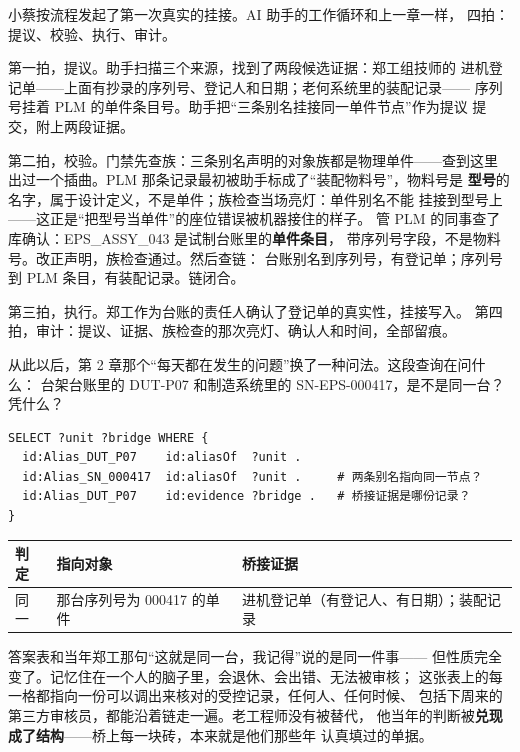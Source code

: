 小蔡按流程发起了第一次真实的挂接。AI 助手的工作循环和上一章一样，
四拍：提议、校验、执行、审计。

第一拍，提议。助手扫描三个来源，找到了两段候选证据：郑工组技师的
进机登记单——上面有抄录的序列号、登记人和日期；老何系统里的装配记录——
序列号挂着 PLM 的单件条目号。助手把“三条别名挂接同一单件节点”作为提议
提交，附上两段证据。

第二拍，校验。门禁先查族：三条别名声明的对象族都是物理单件——查到这里
出过一个插曲。PLM 那条记录最初被助手标成了“装配物料号”，物料号是
\textbf{型号}的名字，属于设计定义，不是单件；族检查当场亮灯：单件别名不能
挂接到型号上——这正是“把型号当单件”的座位错误被机器接住的样子。
管 PLM 的同事查了库确认：EPS\_ASSY\_043 是试制台账里的\textbf{单件条目}，
带序列号字段，不是物料号。改正声明，族检查通过。然后查链：
台账别名到序列号，有登记单；序列号到 PLM 条目，有装配记录。链闭合。

第三拍，执行。郑工作为台账的责任人确认了登记单的真实性，挂接写入。
第四拍，审计：提议、证据、族检查的那次亮灯、确认人和时间，全部留痕。

从此以后，第 2 章那个“每天都在发生的问题”换了一种问法。这段查询在问什么：
台架台账里的 DUT-P07 和制造系统里的 SN-EPS-000417，是不是同一台？凭什么？

\nopagebreak[4]
\begin{codebox}
\begin{Verbatim}[fontsize=\small,breaklines=true,breakanywhere=true,breaksymbolleft={},breaksymbolright={}]
SELECT ?unit ?bridge WHERE {
  id:Alias_DUT_P07    id:aliasOf  ?unit .
  id:Alias_SN_000417  id:aliasOf  ?unit .     # 两条别名指向同一节点？
  id:Alias_DUT_P07    id:evidence ?bridge .   # 桥接证据是哪份记录？
}
\end{Verbatim}
\end{codebox}

\begin{center}
\begingroup\small
\setlength{\tabcolsep}{4pt}
\begin{tabularx}{\linewidth}{@{}XXX@{}}
\toprule
判定 & 指向对象 & 桥接证据 \\
\midrule
同一 & 那台序列号为 000417 的单件 & 进机登记单（有登记人、有日期）；装配记录 \\
\bottomrule
\end{tabularx}
\endgroup
\end{center}

答案表和当年郑工那句“这就是同一台，我记得”说的是同一件事——
但性质完全变了。记忆住在一个人的脑子里，会退休、会出错、无法被审核；
这张表上的每一格都指向一份可以调出来核对的受控记录，任何人、任何时候、
包括下周来的第三方审核员，都能沿着链走一遍。老工程师没有被替代，
他当年的判断被\textbf{兑现成了结构}——桥上每一块砖，本来就是他们那些年
认真填过的单据。

